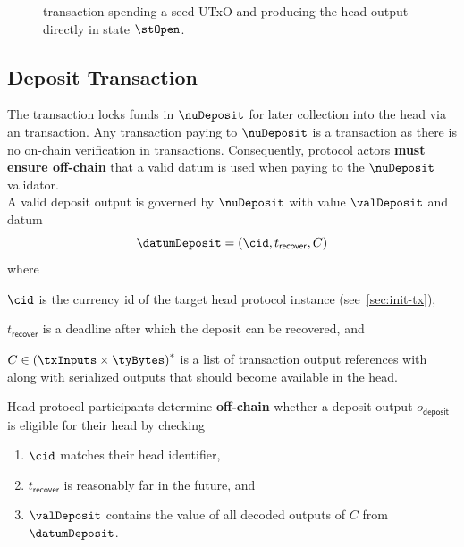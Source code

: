 \begin{figure}[H]
	\centering
	
	\caption{\mtxInit{} transaction spending a seed UTxO and producing the head
		output directly in state $\stOpen$.}\label{fig:initTx}
\end{figure}

\subsection{Deposit Transaction}\label{sec:deposit-tx}

\noindent The \mtxDeposit{} transaction locks funds in $\nuDeposit$ for later
collection into the head via an \mtxIncrement{} transaction. Any transaction
paying to $\nuDeposit$ is a \mtxDeposit{} transaction as there is no on-chain
verification in \mtxDeposit{} transactions. Consequently, protocol actors
\textbf{must ensure off-chain} that a valid datum is used when paying to the
$\nuDeposit$ validator. \\

\noindent A valid deposit output is governed by $\nuDeposit$ with value $\valDeposit$ and datum
\[
	\datumDeposit = (\cid, t_{\mathsf{recover}}, C)
\]
where
\begin{mitemize}
	\item $\cid$ is the currency id of the target head protocol instance (see~\ref{sec:init-tx}),
	\item $t_{\mathsf{recover}}$ is a deadline after which the deposit can be recovered, and
	\item $C \in {(\txInputs \times \tyBytes)}^{*}$ is a list of transaction output
	references with along with serialized outputs that should become available in
	the head.
\end{mitemize}

\noindent Head protocol participants determine \textbf{off-chain} whether a
deposit output $o_{\mathsf{deposit}}$ is eligible for their head by checking
\begin{enumerate}
	\item $\cid$ matches their head identifier,
	\item $t_{\mathsf{recover}}$ is reasonably far in the future, and
	\item $\valDeposit$ contains the value of all decoded outputs of $C$ from $\datumDeposit$.
\end{enumerate}

